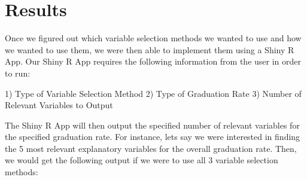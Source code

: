 \documentclass{article}
\begin{document}


\section{Results}
Once we figured out which variable selection methods we wanted to use and how we wanted to use them, we were then able to implement them using a Shiny R App. Our Shiny R App requires the following information from the user in order to run:

1) Type of Variable Selection Method
2) Type of Graduation Rate
3) Number of Relevant Variables to Output

The Shiny R App will then output the specified number of relevant variables for the specified graduation rate. For instance, lets say we were interested in finding the 5 most relevant explanatory variables for the overall graduation rate. Then, we would get the following output if we were to use all 3 variable selection methods:
\end{document}
